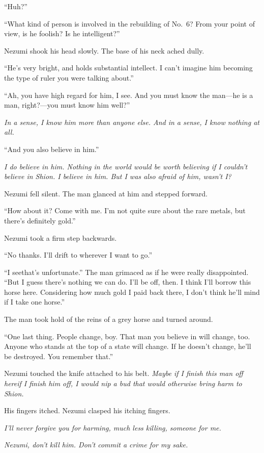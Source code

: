 ``\el Huh?''

``What kind of person is involved in the rebuilding of No.~6? From your
point of view, is he foolish? Is he intelligent?''

Nezumi shook his head slowly. The base of his neck ached dully.

``He's very bright, and holds substantial intellect. I can't imagine him
becoming the type of ruler you were talking about.''

``Ah, you have high regard for him, I see. And you must know the man---he
is a man, right?---you must know him well?''

\emph{In a sense, I know him more than anyone else. And in a sense, I know
nothing at all.}

``And you also believe in him.''

\emph{I do believe in him. Nothing in the world would be worth believing if I
couldn't believe in Shion. I believe in him. But I was also afraid of
him, wasn't I?}

Nezumi fell silent. The man glanced at him and stepped forward.

``How about it? Come with me. I'm not quite sure about the rare metals,
but there's definitely gold.''

Nezumi took a firm step backwards.

``No thanks. I'll drift to wherever I want to go.''

``I see\el that's unfortunate.'' The man grimaced as if he were really
disappointed. ``But I guess there's nothing we can do. I'll be off,
then. I think I'll borrow this horse here. Considering how much gold I
paid back there, I don't think he'll mind if I take one horse.''

The man took hold of the reins of a grey horse and turned around.

``One last thing. People change, boy. That man you believe in will
change, too. Anyone who stands at the top of a state will change. If he
doesn't change, he'll be destroyed. You remember that.''

Nezumi touched the knife attached to his belt. \emph{Maybe if I finish this
man off here\el if I finish him off, I would nip a bud that would
otherwise bring harm to Shion.}

His fingers itched. Nezumi clasped his itching fingers.

\emph{I'll never forgive you for harming, much less killing, someone for me.}

\emph{Nezumi, don't kill him. Don't commit a crime for my sake.}

